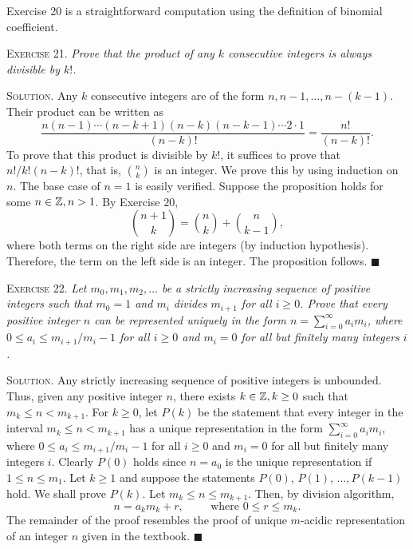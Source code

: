 \documentclass[11pt, leqno]{article}
\newcommand{\done}{\ensuremath{\blacksquare}}
\begin{document}
Exercise 20 is a straightforward computation using the definition of binomial coefficient.

\textsc{Exercise 21}. \emph{Prove that the product of any $k$ consecutive integers is always divisible by $k!$.}

\textsc{Solution}. Any $k$ consecutive integers are of the form $n, n-1, \ldots, n-(k-1)$. Their product can be written as 
\begin{displaymath}
\frac{n(n-1)\cdots (n-k+1)(n-k)(n-k-1)\cdots 2\cdot 1}{(n-k)!} = \frac{n!}{(n-k)!}.
\end{displaymath}
To prove that this product is divisible by $k!$, it suffices to prove that $n!/k!(n-k)!$, that is, $\binom{n}{k}$ is an integer. We prove this by using induction on $n$. The base case of $n=1$ is easily verified. Suppose the proposition holds for some $n\in\mathbb{Z}, n>1$. By Exercise $20$, 
\begin{displaymath}
\binom{n+1}{k} = \binom{n}{k} + \binom{n}{k-1},
\end{displaymath}
where both terms on the right side are integers (by induction hypothesis). Therefore, the term on the left side is an integer. The proposition follows. \done

\textsc{Exercise 22}. \emph{Let $m_0, m_1, m_2,\ldots$ be a strictly increasing sequence of positive integers such that $m_0=1$ and $m_i$ divides $m_{i+1}$ for all $i\geq 0$. Prove that every positive integer $n$ can be represented uniquely in the form $n = \sum_{i=0}^{\infty}a_im_i$, where $0\leq a_i \leq m_{i+1}/m_i-1$ for all $i\geq 0$ and $m_i=0$ for all but finitely many integers $i$.}

\textsc{Solution}. Any strictly increasing sequence of positive integers is unbounded. Thus, given any positive integer $n$, there exists $k\in\mathbb{Z}, k\geq 0$ such that $m_k \leq n < m_{k+1}$. For $k\geq 0$, let $P(k)$ be the statement that every integer in the interval $m_k \leq n < m_{k+1}$ has a unique representation in the form $\sum_{i=0}^{\infty} a_im_i$, where $0\leq a_i \leq m_{i+1}/m_i-1$ for all $i\geq 0$ and $m_i=0$ for all but finitely many integers $i$. Clearly $P(0)$ holds since $n=a_0$ is the unique representation if $1 \leq n \leq m_1$. Let $k\geq 1$ and suppose the statements $P(0)$, $P(1)$, $\ldots, P(k-1)$ hold. We shall prove $P(k)$. Let $m_k \leq n \leq m_{k+1}$. Then, by division algorithm, 
\begin{displaymath}
n = a_k m_k + r, \hspace{1cm} \text{where } 0\leq r \leq m_k.
\end{displaymath}
The remainder of the proof resembles the proof of unique $m$-acidic representation of an integer $n$ given in the textbook. \done
\end{document}
